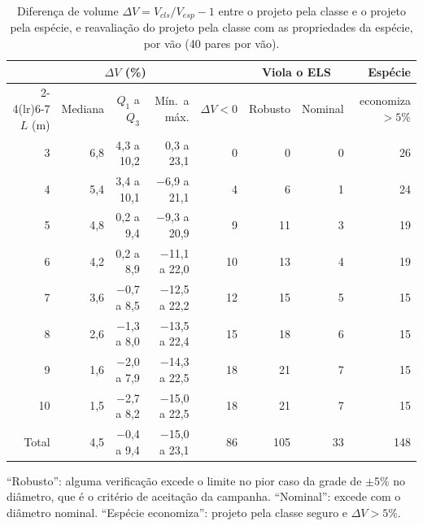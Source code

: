 \begin{table}[!ht]
\centering
\caption{Diferença de volume $\Delta V=V_{cls}/V_{esp}-1$ entre o projeto pela classe e o projeto pela espécie, e reavaliação do projeto pela classe com as propriedades da espécie, por vão (40 pares por vão).}
\label{tab:res_vao}
\footnotesize
\setlength{\tabcolsep}{4pt}
\begin{tabular}{rrrrrrrr}
\toprule
 & \multicolumn{3}{c}{$\Delta V$ (\%)} & & \multicolumn{2}{c}{Viola o ELS} & Espécie \\
\cmidrule(lr){2-4}\cmidrule(lr){6-7}
$L$ (m) & Mediana & $Q_1$ a $Q_3$ & Mín.\ a máx. & $\Delta V<0$ & Robusto & Nominal & economiza $>5\%$ \\
\midrule
3 & 6{,}8 & 4{,}3 a 10{,}2 & 0{,}3 a 23{,}1 & 0 & 0 & 0 & 26 \\
4 & 5{,}4 & 3{,}4 a 10{,}1 & $-$6{,}9 a 21{,}1 & 4 & 6 & 1 & 24 \\
5 & 4{,}8 & 0{,}2 a 9{,}4 & $-$9{,}3 a 20{,}9 & 9 & 11 & 3 & 19 \\
6 & 4{,}2 & 0{,}2 a 8{,}9 & $-$11{,}1 a 22{,}0 & 10 & 13 & 4 & 19 \\
7 & 3{,}6 & $-$0{,}7 a 8{,}5 & $-$12{,}5 a 22{,}2 & 12 & 15 & 5 & 15 \\
8 & 2{,}6 & $-$1{,}3 a 8{,}0 & $-$13{,}5 a 22{,}4 & 15 & 18 & 6 & 15 \\
9 & 1{,}6 & $-$2{,}0 a 7{,}9 & $-$14{,}3 a 22{,}5 & 18 & 21 & 7 & 15 \\
10 & 1{,}5 & $-$2{,}7 a 8{,}2 & $-$15{,}0 a 22{,}5 & 18 & 21 & 7 & 15 \\
\midrule
Total & 4{,}5 & $-$0{,}4 a 9{,}4 & $-$15{,}0 a 23{,}1 & 86 & 105 & 33 & 148 \\
\bottomrule
\end{tabular}
\begin{minipage}{0.95\linewidth}\vspace{2pt}\footnotesize
``Robusto'': alguma verificação excede o limite no pior caso da grade de $\pm5\%$ no diâmetro, que é o critério de aceitação da campanha. ``Nominal'': excede com o diâmetro nominal. ``Espécie economiza'': projeto pela classe seguro e $\Delta V>5\%$.
\end{minipage}
\end{table}